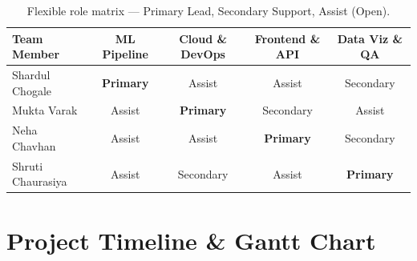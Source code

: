 \documentclass[11pt, a4paper]{article}
\begin{document}
\begin{table}[h!]
\centering
\small
\renewcommand{\arraystretch}{1.3}
\begin{tabular}{|l|c|c|c|c|}
\hline
\rowcolor{primary!10}
\textbf{Team Member} & \textbf{ML Pipeline} & \textbf{Cloud \& DevOps} & \textbf{Frontend \& API} & \textbf{Data Viz \& QA} \\
\hline
Shardul Chogale  & \cellcolor{green!15}\textbf{Primary} & Assist & Assist & \cellcolor{yellow!15}Secondary \\
\hline
Mukta Varak      & Assist & \cellcolor{green!15}\textbf{Primary} & \cellcolor{yellow!15}Secondary & Assist \\
\hline
Neha Chavhan     & Assist & Assist & \cellcolor{green!15}\textbf{Primary} & \cellcolor{yellow!15}Secondary \\
\hline
Shruti Chaurasiya & Assist & \cellcolor{yellow!15}Secondary & Assist & \cellcolor{green!15}\textbf{Primary} \\
\hline
\end{tabular}
\caption{Flexible role matrix — \colorbox{green!15}{Primary Lead}, \colorbox{yellow!15}{Secondary Support}, Assist (Open).}
\end{table}

\section{Project Timeline \& Gantt Chart}
\label{sec:timeline}
\end{document}

